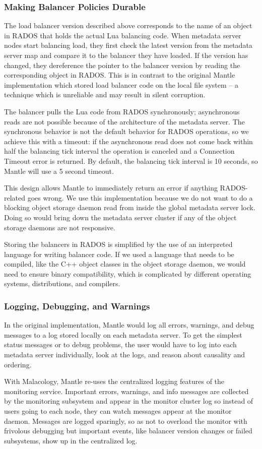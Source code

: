 \subsubsection{Making Balancer Policies Durable}

The load balancer version described above corresponds to the name of an object
in RADOS that holds the actual Lua balancing code.  When metadata server nodes
start balancing load, they first check the latest version from the metadata
server map and compare it to the balancer they have loaded. If the version has
changed, they dereference the pointer to the balancer version by reading the
corresponding object in RADOS. This is in contrast to the original Mantle
implementation which stored load balancer code on the local file system -- a
technique which is unreliable and may result in silent corruption.

The balancer pulls the Lua code from RADOS synchronously; asynchronous reads
are not possible because of the architecture of the metadata server. The
synchronous behavior is not the default behavior for RADOS operations, so we
achieve this with a timeout: if the asynchronous read does not come back within
half the balancing tick interval the operation is canceled and a Connection
Timeout error is returned. By default, the balancing tick interval is 10
seconds, so Mantle will use a 5 second timeout.

This design allows Mantle to immediately return an error if anything
RADOS-related goes wrong.  We use this implementation because we do not want to
do a blocking object storage daemon read from inside the global metadata server
lock. Doing so would bring down the metadata server cluster if any of the
object storage daemons are not responsive.

Storing the balancers in RADOS is simplified by the use of an interpreted
language for writing balancer code. If we used a language that needs to be
compiled, like the C++ object classes in the object storage daemon, we would
need to ensure binary compatibility, which is complicated by different
operating systems, distributions, and compilers.

\subsubsection{Logging, Debugging, and Warnings}

In the original implementation, Mantle would log all errors, warnings, and
debug messages to a log stored locally on each metadata server. To get the
simplest status messages or to debug problems, the user would have to log into
each metadata server individually, look at the logs, and reason about causality
and ordering.

With Malacology, Mantle re-uses the centralized logging features of the
monitoring service. Important errors, warnings, and info messages are collected
by the monitoring subsystem and appear in the monitor cluster log so instead of
users going to each node, they can watch messages appear at the monitor daemon.
Messages are logged sparingly, so as not to overload the monitor with frivolous
debugging but important events, like balancer version changes or failed
subsystems, show up in the centralized log.

